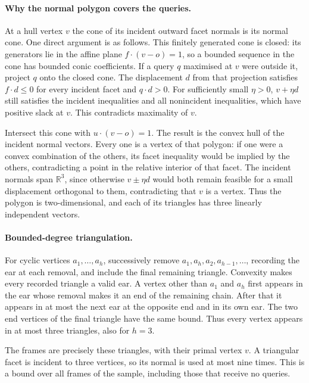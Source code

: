 \documentclass[notab,a4paper,UKenglish,numberwithinsect]{socg-lipics-v2021}
\newcommand{\R}{\mathbb R}
\begin{document}
\paragraph*{Why the normal polygon covers the queries.}
At a hull vertex $v$ the cone of its incident outward facet normals is its normal cone. One direct argument is as follows. This finitely generated cone is closed: its generators lie in the affine plane $f\cdot(v-o)=1$, so a bounded sequence in the cone has bounded conic coefficients. If a query $q$ maximised at $v$ were outside it, project $q$ onto the closed cone. The displacement $d$ from that projection satisfies $f\cdot d\le0$ for every incident facet and $q\cdot d>0$. For sufficiently small $\eta>0$, $v+\eta d$ still satisfies the incident inequalities and all nonincident inequalities, which have positive slack at $v$. This contradicts maximality of $v$.

Intersect this cone with $u\cdot(v-o)=1$. The result is the convex hull of the incident normal vectors. Every one is a vertex of that polygon: if one were a convex combination of the others, its facet inequality would be implied by the others, contradicting a point in the relative interior of that facet. The incident normals span $\R^3$, since otherwise $v\pm\eta d$ would both remain feasible for a small displacement orthogonal to them, contradicting that $v$ is a vertex. Thus the polygon is two-dimensional, and each of its triangles has three linearly independent vectors.

\paragraph*{Bounded-degree triangulation.}
For cyclic vertices $a_1,\ldots,a_h$, successively remove $a_1,a_h,a_2,a_{h-1},\ldots$, recording the ear at each removal, and include the final remaining triangle. Convexity makes every recorded triangle a valid ear. A vertex other than $a_1$ and $a_h$ first appears in the ear whose removal makes it an end of the remaining chain. After that it appears in at most the next ear at the opposite end and in its own ear. The two end vertices of the final triangle have the same bound. Thus every vertex appears in at most three triangles, also for $h=3$.

The frames are precisely these triangles, with their primal vertex $v$. A triangular facet is incident to three vertices, so its normal is used at most nine times. This is a bound over all frames of the sample, including those that receive no queries.
\end{document}

